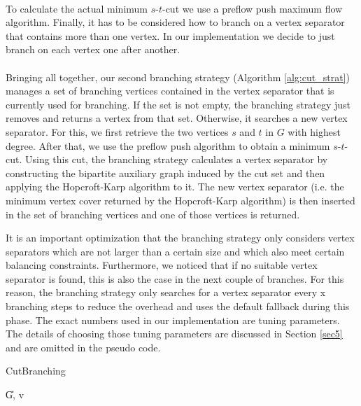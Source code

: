 \documentclass[]{article}
\begin{document}
\paragraph{}
To calculate the actual minimum $s$-$t$-cut we use a preflow push maximum flow algorithm. Finally, it has to be considered how to branch on a vertex separator that contains more than one vertex. In our implementation we decide to just branch on each vertex one after another.
\paragraph{}
Bringing all together, our second branching strategy (Algorithm \ref{alg:cut_strat}) manages a set of branching vertices contained in the vertex separator that is currently used for branching. If the set is not empty, the branching strategy just removes and returns a vertex from that set. Otherwise, it searches a new vertex separator. For this, we first retrieve the two vertices $s$ and $t$ in $G$ with highest degree. After that, we use the preflow push algorithm to obtain a minimum $s$-$t$-cut. Using this cut, the branching strategy calculates a vertex separator by constructing the bipartite auxiliary graph induced by the cut set and then applying the Hopcroft-Karp algorithm to it. The new vertex separator (i.e. the minimum vertex cover returned by the Hopcroft-Karp algorithm) is then inserted in the set of branching vertices and one of those vertices is returned.

It is an important optimization that the branching strategy only considers vertex separators which are not larger than a certain size and which also meet certain balancing constraints. Furthermore, we noticed that if no suitable vertex separator is found, this is also the case in the next couple of branches. For this reason, the branching strategy only searches for a vertex separator every x branching steps to reduce the overhead and uses the default fallback during this phase. The exact numbers used in our implementation are tuning parameters. The details of choosing those tuning parameters are discussed in Section \ref{sec5} and are omitted in the pseudo code. 

\begin{algorithm}
	\caption{CutBranching}\label{alg:cut_strat}
	\DontPrintSemicolon
	
	
	\U{G, v}	
	
	
\end{algorithm}
\end{document}

